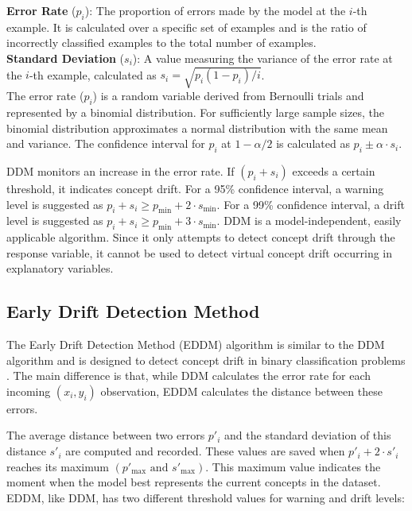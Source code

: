 \documentclass[pdflatex,sn-mathphys-ay]{sn-jnl}%
\theoremstyle{thmstyleone}%
\theoremstyle{thmstyletwo}%
\theoremstyle{thmstylethree}%
\begin{document}
\noindent \textbf{Error Rate} (\(p_i\)): The proportion of errors made by the model at the \(i\)-th example. It is calculated over a specific set of examples and is the ratio of incorrectly classified examples to the total number of examples.\\

\noindent \textbf{Standard Deviation} (\(s_i\)): A value measuring the variance of the error rate at the \(i\)-th example, calculated as \(s_i = \sqrt{p_i(1 - p_i)/i}\).\\

\noindent The error rate (\(p_i\)) is a random variable derived from Bernoulli trials and represented by a binomial distribution. For sufficiently large sample sizes, the binomial distribution approximates a normal distribution with the same mean and variance. The confidence interval for \(p_i\) at \(1 - \alpha/2\) is calculated as \(p_i \pm \alpha \cdot s_i\).

DDM monitors an increase in the error rate. If \((p_i + s_i)\) exceeds a certain threshold, it indicates concept drift. For a 95\% confidence interval, a warning level is suggested as \(p_i + s_i \geq p_{\text{min}} + 2 \cdot s_{\text{min}}\). For a 99\% confidence interval, a drift level is suggested as \(p_i + s_i \geq p_{\text{min}} + 3 \cdot s_{\text{min}}\). DDM is a model-independent, easily applicable algorithm. Since it only attempts to detect concept drift through the response variable, it cannot be used to detect virtual concept drift occurring in explanatory variables.

\subsection{Early Drift Detection Method}
The Early Drift Detection Method (EDDM) algorithm is similar to the DDM algorithm and is designed to detect concept drift in binary classification problems \citep{baena_garcia_2006}. The main difference is that, while DDM calculates the error rate for each incoming \((x_i, y_i)\) observation, EDDM calculates the distance between these errors.

The average distance between two errors \(p'_i\) and the standard deviation of this distance \(s'_i\) are computed and recorded. These values are saved when \(p'_i + 2 \cdot s'_i\) reaches its maximum \((p'_{\text{max}} \text{ and } s'_{\text{max}})\). This maximum value indicates the moment when the model best represents the current concepts in the dataset. EDDM, like DDM, has two different threshold values for warning and drift levels:\\
\end{document}
